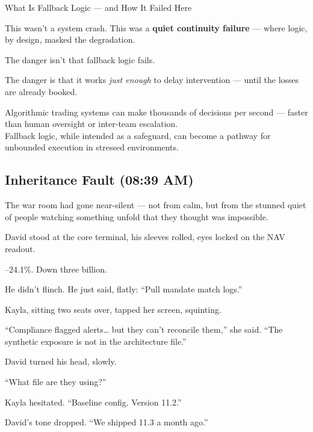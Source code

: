 \begin{TechnicalSidebar}{What Is Fallback Logic — and How It Failed Here}
\begin{itemize}
  \end{itemize}
  
  \medskip
  
  This wasn’t a system crash.  
  This was a \textbf{quiet continuity failure} — where logic, by design, masked the degradation.
  
  \medskip
  
  The danger isn’t that fallback logic fails.
  
  The danger is that it works \textit{just enough} to delay intervention — until the losses are already booked.
  
\end{TechnicalSidebar}

\medskip

\begin{tcolorbox}[title=Latency and Automation, colback=gray!5, colframe=black]
Algorithmic trading systems can make thousands of decisions per second — faster than human oversight or inter-team escalation.\\
Fallback logic, while intended as a safeguard, can become a pathway for unbounded execution in stressed environments.
\end{tcolorbox}

\subsection{Inheritance Fault (08:39 AM)} 

The war room had gone near-silent — not from calm, but from the stunned quiet of people watching something unfold that they thought was impossible.

David stood at the core terminal, his sleeves rolled, eyes locked on the NAV readout.

–24.1\%.
Down three billion.

He didn’t flinch. He just said, flatly:
“Pull mandate match logs.”

Kayla, sitting two seats over, tapped her screen, squinting.

“Compliance flagged alerts… but they can’t reconcile them,” she said. “The synthetic exposure is not in 
the architecture file.”

David turned his head, slowly.

“What file are they using?”

Kayla hesitated. “Baseline config. Version 11.2.”

David’s tone dropped. “We shipped 11.3 a month ago.”

